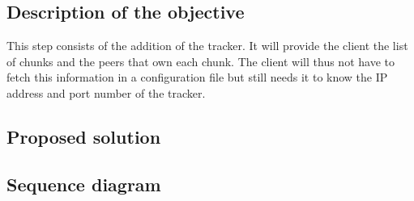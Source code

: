 \subsection{Description of the objective}

This step consists of the addition of the tracker. It will provide the client the list of chunks and the peers that own each chunk. The client will thus not have to fetch this information in a configuration file but still needs it to know the IP address and port number of the tracker.

\subsection{Proposed solution}



\subsection{Sequence diagram}